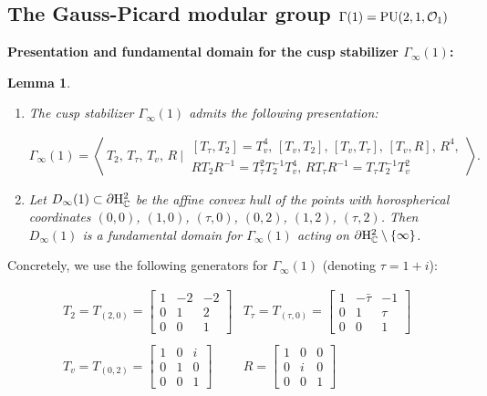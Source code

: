 \documentclass{article}[12pt]
\newcommand{\C}{\mathbb{C}}
\newtheorem{lem}{Lemma}%
\begin{document}
\subsection{The Gauss-Picard modular group $\Gamma(1)={\rm PU}(2,1,\mathcal{O}_1)$}

{\bf Presentation and fundamental domain for the cusp stabilizer $\Gamma_\infty(1)$:}

\begin{lem}\label{d=1Gammainfty} 
\begin{enumerate}
\item The cusp stabilizer $\Gamma_\infty(1)$ admits the following presentation:

$$\Gamma_\infty(1)= \left\langle\ T_2, \, T_\tau, \, T_v, \, R  \ \Big\vert\ 
\begin{array}{c} [ T_\tau,T_2 ]=T_v^4, \, [ T_v, T_2 ], \, [ T_v,T_\tau ], \, [ T_v,R ], \, R^4,  \\

  R T_2 R^{-1}=T_\tau^2T_2^{-1}T_v^4, \, R T_\tau R^{-1}=T_\tau T_2^{-1}T_v^2
  \end{array}\right\rangle.$$

\item Let $D_\infty(1) \subset \partial {\rm H}_\C^2$ be the affine convex hull of the points with horospherical coordinates $(0,0)$, $(1,0)$, $(\tau,0)$, $(0,2)$, $(1,2)$, $(\tau,2)$. Then $D_\infty(1)$ is a fundamental domain for $\Gamma_\infty(1)$ acting on $\partial {\rm H}_\C^2 \setminus \{ \infty \}$.
\end{enumerate}
\end{lem}  
Concretely, we use the following generators for $\Gamma_\infty(1)$ (denoting $\tau=1+i$):

$$
\begin{array}{cc} T_2=T_{(2,0)}=\left[ \begin{array}{ccc} 1 & -2 & -2 \\ 0 & 1 & 2 \\ 0 & 0 & 1 \end{array}\right] & 
  T_\tau = T_{(\tau,0)}=\left[ \begin{array}{ccc} 1 & -\bar{\tau} & -1 \\ 0 & 1 & \tau \\ 0 & 0 & 1 \end{array}\right] \\
  \\
  T_v=T_{(0,2)}=\left[ \begin{array}{ccc} 1 & 0 & i \\ 0 & 1 & 0 \\ 0 & 0 & 1 \end{array}\right] & 
  R=\left[ \begin{array}{ccc} 1 & 0 & 0 \\ 0 & i & 0 \\ 0 & 0 & 1 \end{array}\right]
\end{array}$$
\end{document}
